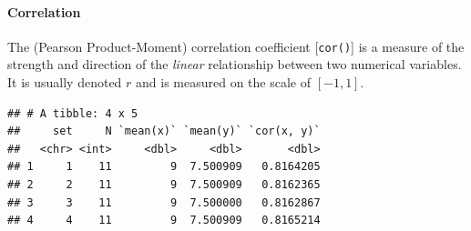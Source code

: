 \documentclass[10pt]{article}\usepackage[]{graphicx}\usepackage[]{color}
\makeatletter
\newenvironment{kframe}{%
 \def\at@end@of@kframe{}%
 \ifinner\ifhmode%
  \def\at@end@of@kframe{\end{minipage}}%
  \begin{minipage}{\columnwidth}%
 \fi\fi%
 \def\FrameCommand##1{\hskip\@totalleftmargin \hskip-\fboxsep
 \colorbox{shadecolor}{##1}\hskip-\fboxsep
     \hskip-\linewidth \hskip-\@totalleftmargin \hskip\columnwidth}%
 \MakeFramed {\advance\hsize-\width
   \@totalleftmargin\z@ \linewidth\hsize
   \@setminipage}}%
 {\par\unskip\endMakeFramed%
 \at@end@of@kframe}
\newenvironment{knitrout}{}{} %
\newcommand{\cmd}[1]{\texttt{#1}}
\makeatother
\begin{document}
\newpage

\paragraph{Correlation}

The (Pearson Product-Moment) correlation coefficient [\cmd{cor()}] is a measure of the strength and direction of the \emph{linear} relationship between two numerical variables. It is usually denoted $r$ and is measured on the scale of $[-1, 1]$. 

\begin{knitrout}
\color{fgcolor}\begin{kframe}
\begin{verbatim}
## # A tibble: 4 x 5
##     set     N `mean(x)` `mean(y)` `cor(x, y)`
##   <chr> <int>     <dbl>     <dbl>       <dbl>
## 1     1    11         9  7.500909   0.8164205
## 2     2    11         9  7.500909   0.8162365
## 3     3    11         9  7.500000   0.8162867
## 4     4    11         9  7.500909   0.8165214
\end{verbatim}
\end{kframe}
\end{knitrout}
\end{document}
